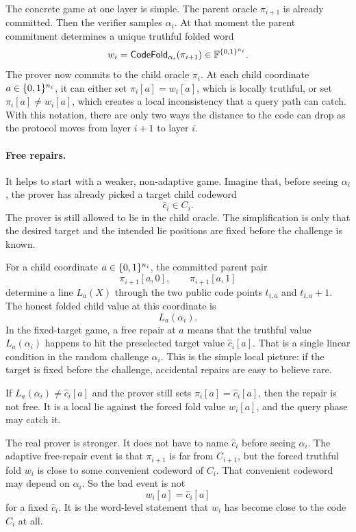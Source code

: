 The concrete game at one layer is simple.  The parent oracle $\pi_{i+1}$ is
already committed.  Then the verifier samples $\alpha_i$.  At that moment the
parent commitment determines a unique truthful folded word
\[
  w_i=\mathsf{CodeFold}_{\alpha_i}(\pi_{i+1})\in\mathbb{F}^{\{0,1\}^{n_i}}.
\]
The prover now commits to the child oracle $\pi_i$.  At each child coordinate
$a\in\{0,1\}^{n_i}$, it can either set $\pi_i[a]=w_i[a]$, which is locally truthful,
or set $\pi_i[a]\ne w_i[a]$, which creates a local inconsistency that a query
path can catch.  With this notation, there are only two ways the distance to the
code can drop as the protocol moves from layer $i+1$ to layer $i$.

\paragraph{Free repairs.}
It helps to start with a weaker, non-adaptive game.  Imagine that, before seeing
$\alpha_i$, the prover has already picked a target child codeword
\[
  \widehat c_i\in C_i.
\]
The prover is still allowed to lie in the child oracle.  The simplification is
only that the desired target and the intended lie positions are fixed before the
challenge is known.

For a child coordinate $a\in\{0,1\}^{n_i}$, the committed parent pair
\[
  \pi_{i+1}[a,0],
  \qquad
  \pi_{i+1}[a,1]
\]
determine a line $L_a(X)$ through the two public code points
$t_{i,a}$ and $t_{i,a}+1$.  The honest folded child value at this coordinate is
\[
  L_a(\alpha_i).
\]
In the fixed-target game, a free repair at $a$ means that the truthful value
$L_a(\alpha_i)$ happens to hit the preselected target value $\widehat c_i[a]$.
That is a single linear condition in the random challenge $\alpha_i$.  This is
the simple local picture: if the target is fixed before the challenge,
accidental repairs are easy to believe rare.

If $L_a(\alpha_i)\ne\widehat c_i[a]$ and the prover still sets
$\pi_i[a]=\widehat c_i[a]$, then the repair is not free.  It is a local lie
against the forced fold value $w_i[a]$, and the query phase may catch it.

The real prover is stronger.  It does not have to name $\widehat c_i$ before
seeing $\alpha_i$.  The adaptive free-repair event is that $\pi_{i+1}$ is far
from $C_{i+1}$, but the forced truthful fold $w_i$ is close to some convenient
codeword of $C_i$.  That convenient codeword may depend on $\alpha_i$.  So the
bad event is not
\[
  w_i[a]=\widehat c_i[a]
\]
for a fixed $\widehat c_i$.  It is the word-level statement that $w_i$ has
become close to the code $C_i$ at all.

